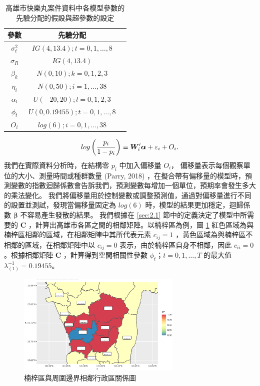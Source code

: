 \documentclass[12pt,a4paper]{article}
\begin{document}
\begin{CJK}{UTF8}{bkai}
\begin{table}[H]
\centering
\setlength{\belowcaptionskip}{0.5cm}
\caption{高雄市快樂丸案件資料中各模型參數的先驗分配的假設與超參數的設定}
\begin{tabular}{ccc}
\hline
參數 & 先驗分配\\
\hline
$\sigma_t^2$ & $IG\left(4,13.4\right); t=0,1,\dots,8$\\
$\sigma_R$ & $IG\left(4,13.4\right)$\\
$\beta_k$ & $N\left(0,10\right); k=0,1,2,3$\\
$\eta_i$ & $N\left(0,50\right); i=1,\dots,38$\\
$\alpha_l$ & $U\left(-20,20\right); l=0,1,2,3$\\
$\phi_t$ & $U\left(0,0.19455\right); t=0,1,\dots,8$\\
$O_i$ & $log(6); i=0,1,\dots,38$\\
\hline
\end{tabular}
\label{table.main2}
\end{table}
\noindent
\newpage
\begin{equation*}
\setlength\abovedisplayskip{25pt}
\setlength\belowdisplayskip{25pt}
log\left(\frac{p_i}{1-p_i} \right) \equiv \bm{W}_{i}^\prime \bm{\alpha} + \varepsilon_{i} + O_i.
\end{equation*}
我們在實際資料分析時，在結構零 $p_i$ 中加入偏移量 $O_i$，
偏移量表示每個觀察單位的大小、測量時間或種群數量 (Parry, 2018) ，在擬合帶有偏移量的模型時，預測變數的指數迴歸係數會告訴我們，預測變數每增加一個單位，預期率會發生多大的乘法變化。
我們將偏移量用於控制變數或調整預測值，通過對偏移量進行不同的設置並測試，發現當偏移量固定為 $log(6)$ 時，模型的結果更加穩定，迴歸係數 $\bm{\beta}$ 不容易產生發散的結果。
我們根據在 \ref{sec:2.1} 節中的定義決定了模型中所需要的 $\bm{C}$ ，計算出高雄市各區之間的相鄰矩陣。以楠梓區為例，圖 \ref{Fig.main3} 紅色區域為與楠梓區相鄰的區域，在相鄰矩陣中其所代表元素 $c_{ij}=1$ ，黃色區域為與楠梓區不相鄰的區域，在相鄰矩陣中以 $c_{ij}=0$ 表示，由於楠梓區自身不相鄰，因此 $c_{ii}=0$ 。根據相鄰矩陣 $\bm{C}$ ，計算得到空間相關性參數 $\phi_t$；$t=0,1,\dots,T$ 的最大值 $\lambda_{(1)}^{-1}=0.19455$。

\begin{figure}[H]
\centering
\includegraphics[width=0.7\textwidth]{example_C}
\caption{楠梓區與周圍邊界相鄰行政區關係圖}
\label{Fig.main3}
\end{figure}
\noindent


\end{CJK}
\end{document}
